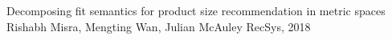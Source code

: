 \documentclass[letterpaper, 10 pt, conference]{ieeeconf}  %
\begin{document}








\begin{thebibliography}{99}

 Decomposing fit semantics for product size recommendation in metric spaces
Rishabh Misra, Mengting Wan, Julian McAuley
RecSys, 2018

\end{thebibliography}
\end{document}
